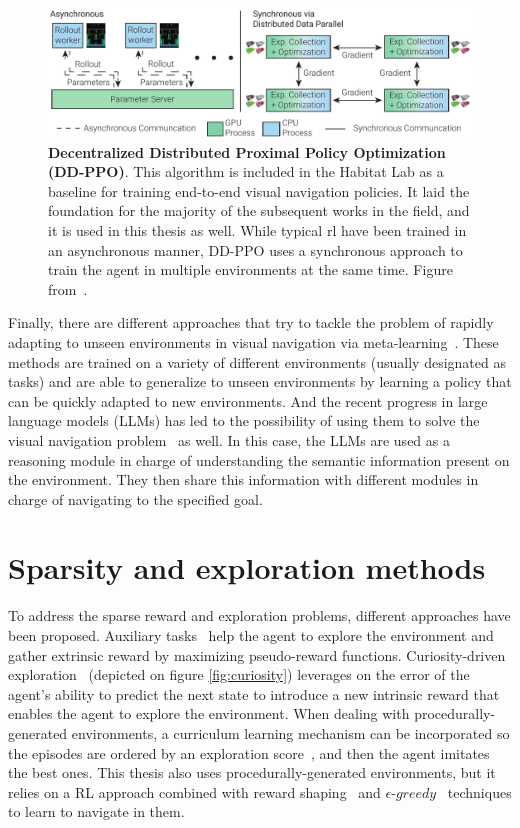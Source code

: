 \begin{figure}
    \centering
    \includegraphics[width=\textwidth]{figures/related_work/ddppo}
    \caption{\textbf{Decentralized Distributed Proximal Policy Optimization (DD-PPO)}.
    This algorithm is included in the Habitat Lab as a baseline for training end-to-end visual navigation policies.
    It laid the foundation for the majority of the subsequent works in the field, and it is used in this thesis as well.
    While typical \acrshort{rl} have been trained in an asynchronous manner, DD-PPO uses a synchronous approach to train the agent in multiple environments at the same time.
    Figure from~\cite{wijmans2020}.}
    \label{fig:ddppo}
\end{figure}

Finally, there are different approaches that try to tackle the problem of rapidly adapting to unseen environments in visual navigation via meta-learning~\cite{wortsman2019, luo2021, zhang2022}.
These methods are trained on a variety of different environments (usually designated as tasks) and are able to generalize to unseen environments by learning a policy that can be quickly adapted to new environments.
And the recent progress in large language models (LLMs) has led to the possibility of using them to solve the visual navigation problem~\cite{Huang2023, Zhou2023} as well.
In this case, the LLMs are used as a reasoning module in charge of understanding the semantic information present on the environment.
They then share this information with different modules in charge of navigating to the specified goal.

\section{Sparsity and exploration methods}\label{sec:sparsity-and-exploration-methods}
To address the sparse reward and exploration problems, different approaches have been proposed.
Auxiliary tasks~\cite{jaderberg2016, ye2021} help the agent to explore the environment and gather extrinsic reward by maximizing pseudo-reward functions.
Curiosity-driven exploration~\cite{pathak2017} (depicted on figure \ref{fig:curiosity}) leverages on the error of the agent's ability to predict the next state to introduce a new intrinsic reward that enables the agent to explore the environment.
When dealing with procedurally-generated environments, a curriculum learning mechanism can be incorporated so the episodes are ordered by an exploration score~\cite{zha2020b}, and then the agent imitates the best ones.
This thesis also uses procedurally-generated environments, but it relies on a RL approach combined with reward shaping~\cite{ng1999, jestel2021} and $\epsilon\text{-}greedy$~\cite{mnih2013} techniques to learn to navigate in them.

